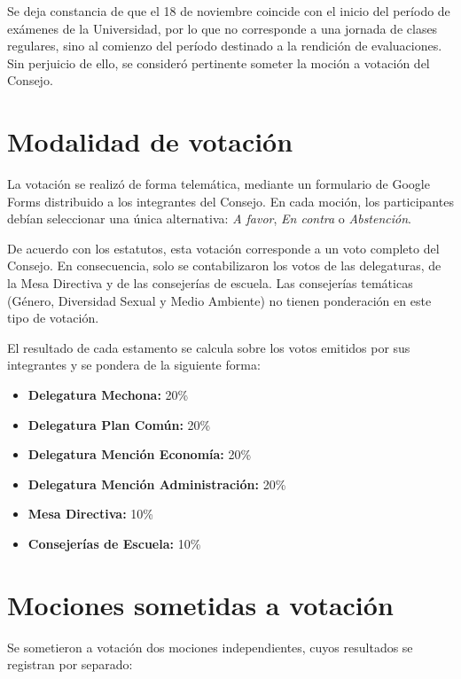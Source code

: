\documentclass[12pt,letterpaper]{article}
\begin{document}
Se deja constancia de que el 18 de noviembre coincide con el inicio del período de exámenes de la Universidad, por lo que no corresponde a una jornada de clases regulares, sino al comienzo del período destinado a la rendición de evaluaciones. Sin perjuicio de ello, se consideró pertinente someter la moción a votación del Consejo.

\section{Modalidad de votación}

La votación se realizó de forma telemática, mediante un formulario de Google Forms distribuido a los integrantes del Consejo. En cada moción, los participantes debían seleccionar una única alternativa: \emph{A favor}, \emph{En contra} o \emph{Abstención}.

De acuerdo con los estatutos, esta votación corresponde a un voto completo del Consejo. En consecuencia, solo se contabilizaron los votos de las delegaturas, de la Mesa Directiva y de las consejerías de escuela. Las consejerías temáticas (Género, Diversidad Sexual y Medio Ambiente) no tienen ponderación en este tipo de votación.

El resultado de cada estamento se calcula sobre los votos emitidos por sus integrantes y se pondera de la siguiente forma:

\begin{itemize}
  \item \textbf{Delegatura Mechona:} 20\%
  \item \textbf{Delegatura Plan Común:} 20\%
  \item \textbf{Delegatura Mención Economía:} 20\%
  \item \textbf{Delegatura Mención Administración:} 20\%
  \item \textbf{Mesa Directiva:} 10\%
  \item \textbf{Consejerías de Escuela:} 10\%
\end{itemize}

\section{Mociones sometidas a votación}

Se sometieron a votación dos mociones independientes, cuyos resultados se registran por separado:
\end{document}
